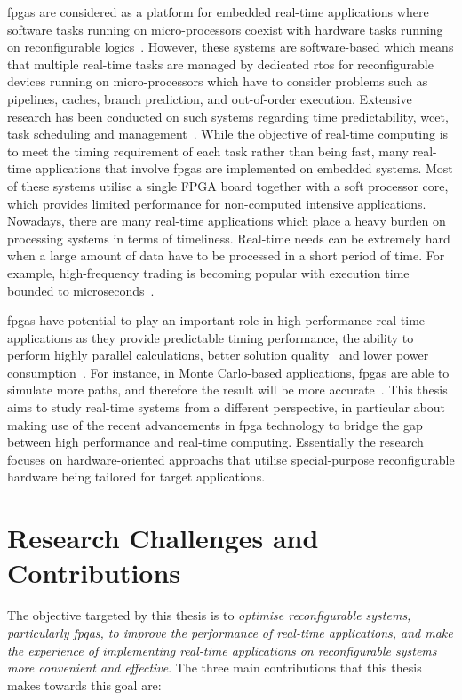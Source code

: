 \glspl{fpga} are considered as a platform for embedded real-time applications where software tasks running on micro-processors coexist with hardware tasks running on reconfigurable logics~\cite{paul12,schoeberl08,whitham09}.
However, these systems are software-based which means that multiple real-time tasks are managed by dedicated \gls{rtos} for reconfigurable devices running on micro-processors which have to consider problems such as pipelines, caches, branch prediction, and out-of-order execution.
Extensive research has been conducted on such systems regarding time predictability, \gls{wcet}, task scheduling and management~\cite{burns01,davis11,puschner00}.
While the objective of real-time computing is to meet the timing requirement of each task rather than being fast, many real-time applications that involve \glspl{fpga} are implemented on embedded systems.
Most of these systems utilise a single FPGA board together with a soft processor core, which provides limited performance for non-computed intensive applications.
Nowadays, there are many real-time applications which place a heavy burden on processing systems in terms of timeliness.
Real-time needs can be extremely hard when a large amount of data have to be processed in a short period of time.
For example, high-frequency trading is becoming popular with execution time bounded to microseconds~\cite{mcgowan10}. 

\glspl{fpga} have potential to play an important role in high-performance real-time applications as they provide predictable timing performance, the ability to 
perform highly parallel calculations, better solution quality~\cite{chau13fpt,chau14fccm} and lower power consumption~\cite{chau13arc}.
For instance, in Monte Carlo-based applications, \glspl{fpga} are able to simulate more paths, and therefore the result will be more accurate~\cite{chau14fccm}.
This thesis aims to study real-time systems from a different perspective, in particular about making use of the recent advancements in \gls{fpga} technology to bridge the gap between high performance and real-time computing.
Essentially the research focuses on hardware-oriented approachs that utilise special-purpose reconfigurable hardware being tailored for target applications.

\section{Research Challenges and Contributions}

The objective targeted by this thesis is to \textit{optimise reconfigurable systems, particularly \glspl{fpga}, to improve the performance of real-time applications, and make the experience of implementing real-time applications on reconfigurable systems more convenient and effective}.
The three main contributions that this thesis makes towards this goal are:

